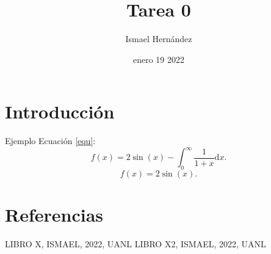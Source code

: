 \documentclass{article}
\title{Tarea 0}
\author{Ismael Hernández}
\date{enero 19 2022}
\begin{document}
\maketitle

\section{Introducción}

Ejemplo Ecuación \eqref{equ}:
\begin{equation}
  f(x) = 2 \sin(x) - \int_0^\infty \frac{1}{1 + x} \text{d}x.
  \label{equ}
\end{equation}
\begin{equation}
  f(x) = 2 \sin(x).
  \label{equ}
\end{equation}

\section{Referencias}

 LIBRO X, ISMAEL, 2022, UANL
 LIBRO X2, ISMAEL, 2022, UANL
\end{document}
